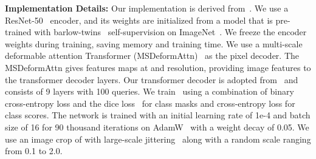 \documentclass[10pt,twocolumn,letterpaper]{article}
\newcommand{\myparagraph}[1]{\vspace{3pt}\noindent\textbf{#1}}
\newcommand\our{\text{Mask2Anomaly}}
\begin{document}
\myparagraph{Implementation Details:}  Our implementation is  derived from~\cite{cheng2021per,cheng2022masked}. We use a ResNet-50~\cite{he2016deep} encoder, and its weights are initialized from a model that is pre-trained with barlow-twins~\cite{zbontar2021barlow} self-supervision on ImageNet~\cite{deng2009imagenet}. We freeze the encoder weights during training, saving memory and training time. We use a multi-scale deformable attention Transformer (MSDeformAttn)~\cite{zhu2020deformable} as the pixel decoder. The MSDeformAttn gives features maps at  and  resolution, providing image features to the transformer decoder layers. Our transformer decoder is adopted from~\cite{cheng2022masked} and consists of 9 layers with 100 queries. We train~\our{} using a combination of binary cross-entropy loss and the dice loss~\cite{milletari2016v} for class masks and cross-entropy loss for class scores. The network is trained with an initial learning rate of 1e-4 and batch size of 16 for 90 thousand iterations on AdamW~\cite{loshchilov2017decoupled} with a weight decay of 0.05. We use an image crop of  with large-scale jittering~\cite{du2021simple} along with a random scale ranging from 0.1 to 2.0.
\end{document}
